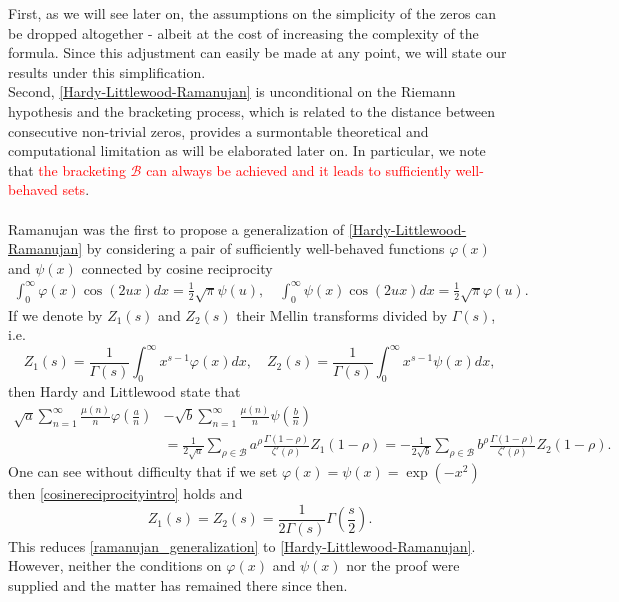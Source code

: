 \documentclass[11pt]{article}
\numberwithin{equation}{section}		 			%
\numberwithin{figure}{section}			 			%
\begin{document}
First, as we will see later on, the assumptions on the simplicity of the zeros can be dropped altogether - albeit at the cost of increasing the complexity of the formula. Since this adjustment can easily be made at any point, we will state our results under this simplification.\\
Second, \eqref{Hardy-Littlewood-Ramanujan} is unconditional on the Riemann hypothesis and the bracketing process, which is related to the distance between consecutive non-trivial zeros, provides a surmontable theoretical and computational limitation as will be elaborated later on. In particular, we note that \textcolor{red}{the bracketing $\mathcal{B}$ can always be achieved and it leads to sufficiently well-behaved sets}.\\\\
Ramanujan \cite{hardy_littlewood} was the first to propose a generalization of \eqref{Hardy-Littlewood-Ramanujan} by considering a pair of sufficiently well-behaved functions $\varphi(x)$ and $\psi(x)$ connected by cosine reciprocity
\begin{align} \label{cosinereciprocityintro}
\int_0^\infty  {\varphi (x)\cos (2ux)dx}  = \frac{1}{2}\sqrt \pi  \psi (u),\quad \int_0^\infty  {\psi (x)\cos (2ux)dx}  = \frac{1}{2}\sqrt \pi  \varphi (u).
\end{align}
If we denote by $Z_1(s)$ and $Z_2(s)$ their Mellin transforms divided by $\Gamma(s)$, i.e.
\[{Z_1}(s) = \frac{1}{{\Gamma (s)}}\int_0^\infty  {{x^{s - 1}}\varphi (x)dx} ,\quad {Z_2}(s) = \frac{1}{{\Gamma (s)}}\int_0^\infty  {{x^{s - 1}}\psi (x)dx}, \]
then Hardy and Littlewood state that
\begin{align} \label{ramanujan_generalization}
  \sqrt a \sum\limits_{n = 1}^\infty  {\frac{{\mu (n)}}{n}\varphi \left( {\frac{a}{n}} \right)} &- \sqrt b \sum\limits_{n = 1}^\infty  {\frac{{\mu (n)}}{n}\psi \left( {\frac{b}{n}} \right)}  \nonumber \\
   &= \frac{1}{{2\sqrt a }}\sum\limits_{\rho  \in \mathcal{B}} {{a^\rho }\frac{{\Gamma (1 - \rho )}}{{\zeta '(\rho )}}{Z_1}(1 - \rho )}  =  - \frac{1}{{2\sqrt b }}\sum\limits_{\rho  \in \mathcal{B}} {{b^\rho }\frac{{\Gamma (1 - \rho )}}{{\zeta '(\rho )}}{Z_2}(1 - \rho )}.  
\end{align}
One can see without difficulty that if we set $\varphi(x)=\psi(x)=\exp(-x^2)$ then \eqref{cosinereciprocityintro} holds and
\[{Z_1}(s) = {Z_2}(s) = \frac{1}{{2\Gamma (s)}}\Gamma \left( {\frac{s}{2}} \right).\]
This reduces \eqref{ramanujan_generalization} to \eqref{Hardy-Littlewood-Ramanujan}. However, neither the conditions on $\varphi(x)$ and $\psi(x)$ nor the proof were supplied and the matter has remained there since then.\\\\
\end{document}
